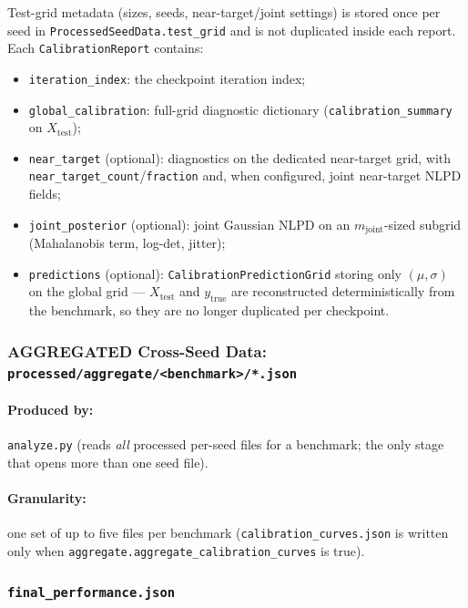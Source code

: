 \documentclass[11pt]{article}
\begin{document}
Test-grid metadata (sizes, seeds, near-target/joint settings) is stored once
per seed in \texttt{ProcessedSeedData.test\_grid} and is not duplicated inside
each report. Each \texttt{CalibrationReport} contains:
\begin{itemize}
  \item \texttt{iteration\_index}: the checkpoint iteration index;
  \item \texttt{global\_calibration}: full-grid diagnostic dictionary
        (\texttt{calibration\_summary} on $X_{\mathrm{test}}$);
  \item \texttt{near\_target} (optional): diagnostics on the dedicated
        near-target grid, with \texttt{near\_target\_count}/\texttt{fraction}
        and, when configured, joint near-target NLPD fields;
  \item \texttt{joint\_posterior} (optional): joint Gaussian NLPD on an
        $m_{\mathrm{joint}}$-sized subgrid (Mahalanobis term, log-det, jitter);
  \item \texttt{predictions} (optional): \texttt{CalibrationPredictionGrid}
        storing only $(\mu,\sigma)$ on the global grid --- $X_{\mathrm{test}}$ and
        $y_{\mathrm{true}}$ are reconstructed deterministically from the
        benchmark, so they are no longer duplicated per checkpoint.
\end{itemize}
 
\subsubsection{AGGREGATED Cross-Seed Data:
  \texttt{processed/aggregate/<benchmark>/*.json}}
\label{sec:aggregate}
 
\paragraph{Produced by:} \texttt{analyze.py} (reads \emph{all} processed per-seed files for a benchmark; the only stage that opens more than one seed file).
\paragraph{Granularity:} one set of up to five files per benchmark
(\texttt{calibration\_curves.json} is written only when
\texttt{aggregate.aggregate\_calibration\_curves} is true).

 
\subsubsection{\texttt{final\_performance.json}}
 
\end{document}
